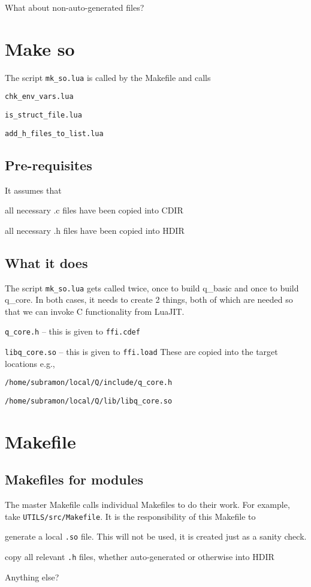 What about non-auto-generated files? \TBC

\section{Make so}

The script {\tt mk\_so.lua} is called by the Makefile and calls
\be 
\item {\tt chk\_env\_vars.lua}
\item {\tt is\_struct\_file.lua}
\item {\tt add\_h\_files\_to\_list.lua}
\ee

\subsection{Pre-requisites}
It assumes that 
\be
\item all necessary .c files have been copied into CDIR
\item all necessary .h files have been copied into HDIR
\ee

\subsection{What it does}

The script \verb+mk_so.lua+ gets called twice, 
once to build q\_basic and once to build q\_core.
In both cases, it needs to create 2 things, both of which are needed so that we
can invoke C functionality from LuaJIT.
\be
\item \verb+q_core.h+ -- this is given to {\tt ffi.cdef}
\item \verb+libq_core.so+ -- this is given to {\tt ffi.load}
\ee
These are copied into the target locations e.g.,
\be
\item \verb+/home/subramon/local/Q/include/q_core.h+
\item \verb+/home/subramon/local/Q/lib/libq_core.so+
\ee

\section{Makefile}

\subsection{Makefiles for modules}
The master Makefile calls individual Makefiles to do their work. For example,
take \verb+UTILS/src/Makefile+. It is the responsibility of this Makefile to
\be
\item generate a local \verb+.so+ file. This will not be used, it is created
just as a sanity check.
\item copy all relevant \verb+.h+ files, whether auto-generated or otherwise
into HDIR 
\item Anything else? \TBC
\ee

